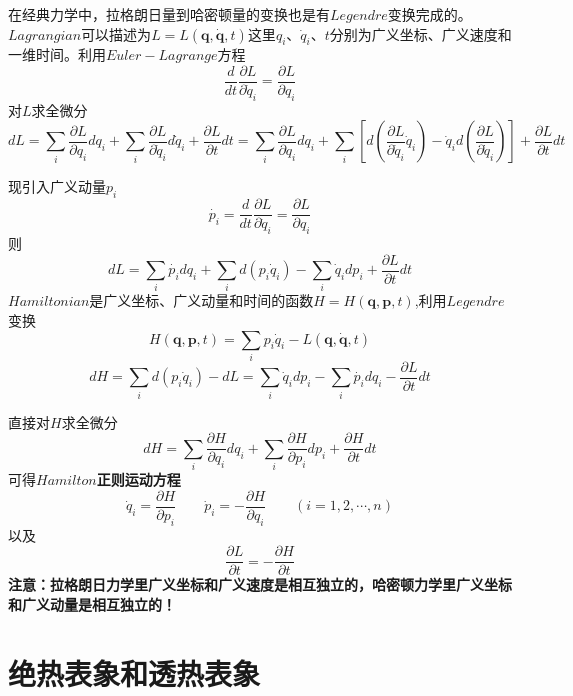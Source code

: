 在经典力学中，拉格朗日量到哈密顿量的变换也是有$Legendre$变换完成的。
$Lagrangian$可以描述为$L=L(\mathbf{q},\dot{\mathbf{q}},t)$这里$q_i$、$\dot{q}_i$、$t$分别为广义坐标、广义速度和一维时间。利用$Euler-Lagrange$方程
\[\frac{d}{dt}\frac{\partial L}{\partial \dot{q}_i}=\frac{\partial L}{\partial q_i}\]
对$L$求全微分
\[dL=\sum_i\frac{\partial L}{\partial q_i}dq_i+\sum_i\frac{\partial L}{\partial \dot{q}_i}d\dot{q}_i+\frac{\partial L}{\partial t}dt
=\sum_i\frac{\partial L}{\partial q_i}dq_i+\sum_i\left[d\left(\frac{\partial L}{\partial \dot{q}_i}\dot{q}_i\right)-\dot{q}_id\left(\frac{\partial L}{\partial \dot{q}_i}\right)\right]+\frac{\partial L}{\partial t}dt\]

现引入广义动量$p_i$
\[\dot{p_i}=\frac{d}{dt}\frac{\partial L}{\partial \dot{q}_i}=\frac{\partial L}{\partial q_i}\]
则
\[dL=\sum_i\dot{p_i}dq_i+\sum_id\left(p_i\dot{q}_i\right)-\sum_i\dot{q}_idp_i+\frac{\partial L}{\partial t}dt\]
$Hamiltonian$是广义坐标、广义动量和时间的函数$H=H(\mathbf{q},\mathbf{p},t)$,利用$Legendre$变换
\[H(\mathbf{q},\mathbf{p},t)=\sum_ip_i\dot{q}_i-L(\mathbf{q},\dot{\mathbf{q}},t)\]
\[dH=\sum_id\left(p_i\dot{q}_i\right)-dL=\sum_i\dot{q}_idp_i-\sum_i\dot{p_i}dq_i-\frac{\partial L}{\partial t}dt\]

直接对$H$求全微分
\[dH=\sum_i\frac{\partial H}{\partial q_i}dq_i+\sum_i\frac{\partial H}{\partial p_i}dp_i+\frac{\partial H}{\partial t}dt\]
可得\textbf{$Hamilton$正则运动方程}
\[\dot{q}_i=\frac{\partial H}{\partial p_i} \qquad \dot{p}_i=-\frac{\partial H}{\partial q_i} \qquad (i=1,2,\cdots,n)\]
以及
\[\frac{\partial L}{\partial t}=-\frac{\partial H}{\partial t}\]
\textbf{注意：拉格朗日力学里广义坐标和广义速度是相互独立的，哈密顿力学里广义坐标和广义动量是相互独立的！}

\section{绝热表象和透热表象}